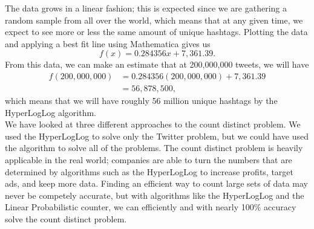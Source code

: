 \documentclass{article}
\begin{document}
The data grows in a linear fashion; this is expected since we are gathering a random sample from all over the world, which means that at any given time, we expect to see more or less the same amount of unique hashtags.
Plotting the data and applying a best fit line using Mathematica gives us
\[
f(x) = 0.284356 x + 7,361.39.
\]
From this data, we can make an estimate that at 200,000,000 tweets, we will have
\begin{align*}
f(200,000,000) &= 0.284356(200,000,000) + 7,361.39\\
&= 56,878,500,
\end{align*}
which means that we will have roughly 56 million unique hashtags by the HyperLogLog algorithm.\\ 
\indent We have looked at three different approaches to the count distinct problem. 
We used the HyperLogLog to solve only the Twitter problem, but we could have used the algorithm to solve all of the problems. 
The count distinct problem is heavily applicable in the real world; companies are able to turn the numbers that are determined by algorithms such as the HyperLogLog to increase profits, target ads, and keep more data.
Finding an efficient way to count large sets of data may never be competely accurate, but with algorithms like the HyperLogLog and the Linear Probabilistic counter, we can efficiently and with nearly 100\% accuracy solve the count distinct problem.
\end{document}
